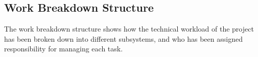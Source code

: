 \documentclass[main.tex]{subfiles}
\begin{document}
\begin{appendices}




\chapter{Work Breakdown Structure}
The work breakdown structure shows how the technical workload of the project has been broken down into different  subsystems, and who has been assigned responsibility for managing each task. 


\end{appendices}
\end{document}
